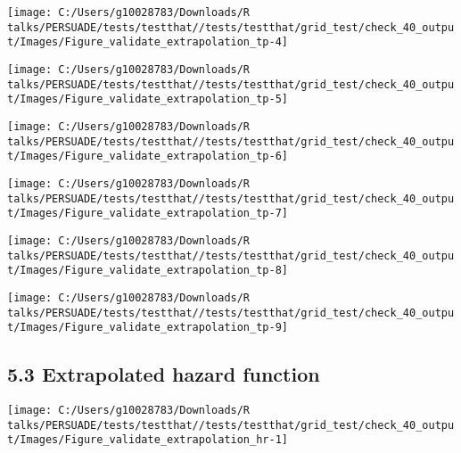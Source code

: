 \documentclass[
]{article}
\begin{document}
\begin{flushleft}\texttt{[image: C:/Users/g10028783/Downloads/R talks/PERSUADE/tests/testthat//tests/testthat/grid\_test/check\_40\_output/Images/Figure\_validate\_extrapolation\_tp-4]} \end{flushleft}

\begin{flushleft}\texttt{[image: C:/Users/g10028783/Downloads/R talks/PERSUADE/tests/testthat//tests/testthat/grid\_test/check\_40\_output/Images/Figure\_validate\_extrapolation\_tp-5]} \end{flushleft}

\begin{flushleft}\texttt{[image: C:/Users/g10028783/Downloads/R talks/PERSUADE/tests/testthat//tests/testthat/grid\_test/check\_40\_output/Images/Figure\_validate\_extrapolation\_tp-6]} \end{flushleft}

\begin{flushleft}\texttt{[image: C:/Users/g10028783/Downloads/R talks/PERSUADE/tests/testthat//tests/testthat/grid\_test/check\_40\_output/Images/Figure\_validate\_extrapolation\_tp-7]} \end{flushleft}

\begin{flushleft}\texttt{[image: C:/Users/g10028783/Downloads/R talks/PERSUADE/tests/testthat//tests/testthat/grid\_test/check\_40\_output/Images/Figure\_validate\_extrapolation\_tp-8]} \end{flushleft}

\begin{flushleft}\texttt{[image: C:/Users/g10028783/Downloads/R talks/PERSUADE/tests/testthat//tests/testthat/grid\_test/check\_40\_output/Images/Figure\_validate\_extrapolation\_tp-9]} \end{flushleft}

\clearpage

\subsection{5.3 Extrapolated hazard
function}\label{extrapolated-hazard-function}

\begin{flushleft}\texttt{[image: C:/Users/g10028783/Downloads/R talks/PERSUADE/tests/testthat//tests/testthat/grid\_test/check\_40\_output/Images/Figure\_validate\_extrapolation\_hr-1]} \end{flushleft}
\end{document}
